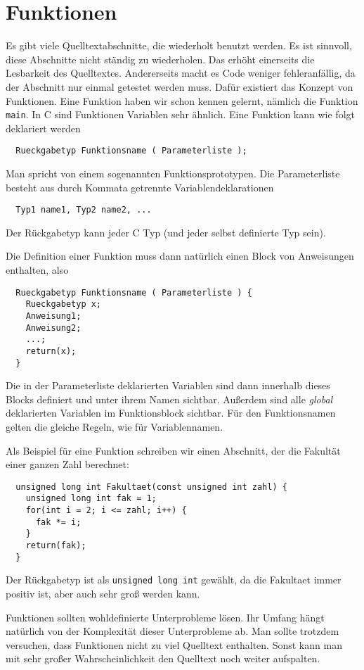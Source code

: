 \section{Funktionen}

Es gibt viele Quelltextabschnitte, die wiederholt benutzt werden.
Es ist sinnvoll, diese Abschnitte nicht ständig zu wiederholen.
Das erhöht einerseits die Lesbarkeit des Quelltextes.
Andererseits macht es Code weniger fehleranfällig, da der Abschnitt nur einmal getestet werden muss.
Dafür existiert das Konzept von Funktionen.
Eine Funktion haben wir schon kennen gelernt, nämlich die Funktion \verb|main|. 
In C sind Funktionen Variablen sehr ähnlich.
Eine Funktion kann wie folgt deklariert werden
\begin{lstlisting}
  Rueckgabetyp Funktionsname ( Parameterliste );
\end{lstlisting}
Man spricht von einem sogenannten Funktionsprototypen.
Die Parameterliste besteht aus durch Kommata getrennte Variablendeklarationen
\begin{lstlisting}
  Typ1 name1, Typ2 name2, ...
\end{lstlisting}
Der Rückgabetyp kann jeder C Typ (und jeder selbst definierte Typ sein).

Die Definition einer Funktion muss dann natürlich einen Block von Anweisungen enthalten, also
\begin{lstlisting}
  Rueckgabetyp Funktionsname ( Parameterliste ) {
    Rueckgabetyp x;
    Anweisung1;
    Anweisung2;
    ...;
    return(x);
  }
\end{lstlisting}
Die in der Parameterliste deklarierten Variablen sind dann innerhalb dieses Blocks definiert und unter ihrem Namen sichtbar.
Außerdem sind alle \emph{global} deklarierten Variablen im Funktionsblock sichtbar.
Für den Funktionsnamen gelten die gleiche Regeln, wie für Variablennamen.

Als Beispiel für eine Funktion schreiben wir einen Abschnitt, der die Fakultät einer ganzen Zahl berechnet:
\begin{lstlisting}
  unsigned long int Fakultaet(const unsigned int zahl) {
    unsigned long int fak = 1;
    for(int i = 2; i <= zahl; i++) {
      fak *= i;
    }
    return(fak);
  }
\end{lstlisting}
Der Rückgabetyp ist als \verb|unsigned long int| gewählt, da die Fakultaet immer positiv ist, aber auch sehr groß werden kann.

Funktionen sollten wohldefinierte Unterprobleme lösen.
Ihr Umfang hängt natürlich von der Komplexität dieser Unterprobleme ab.
Man sollte trotzdem versuchen, dass Funktionen nicht zu viel Quelltext enthalten.
Sonst kann man mit sehr großer Wahrscheinlichkeit den Quelltext noch weiter aufspalten.

